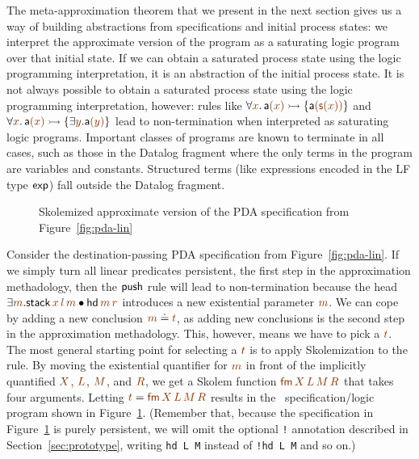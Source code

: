 The meta-approximation theorem that we present in the next section
gives us a way of building abstractions from specifications and
initial process states: we interpret the approximate version of the
program as a saturating logic program over that initial state. If we
can obtain a saturated process state using the logic programming
interpretation, it is an abstraction of the initial process state. It
is not always possible to obtain a saturated process state using the
logic programming interpretation, however: rules like $\forall
\lf{x}.\,{\sf a}\lf{(x)} \lefti \{ {\sf a}\lf{({\sf s}(x))} \}$ and
$\forall \lf{x}.\,{\sf a}\lf{(x)} \lefti \{ \exists \lf{y}. {\sf
  a}\lf{(y)} \}$ lead to non-termination when interpreted as
saturating logic programs. Important classes of programs are known to
terminate in all cases, such as those in the Datalog fragment where
the only terms in the program are variables and constants. Structured
terms (like expressions encoded in the LF type ${\sf exp}$) fall
outside the Datalog fragment.

\begin{figure}
\caption{Skolemized approximate version of the PDA specification from
Figure~\ref{fig:pda-lin}}
\label{fig:pda-pers}
\end{figure}

Consider the destination-passing PDA specification from
Figure~\ref{fig:pda-lin}. If we simply turn all linear predicates
persistent, the first step in the approximation methadology, then the
${\sf push}$ rule will lead to non-termination because the head
$\exists \lf{m}. {\sf stack}\,\lf{x}\,\lf{l}\,\lf{m} \fuse {\sf
  hd}\,\lf{m}\,\lf{r}$ introduces a new existential parameter
$\lf{m}$.  We can cope by adding a new conclusion $\lf{m} \doteq
\lf{t}$, as adding new conclusions is the second step in the
approximation methadology. This, however, means we have to pick a
$\lf{t}$.  The most general starting point for selecting a $\lf{t}$ is
to apply Skolemization to the rule. By moving the existential
quantifier for $\lf{m}$ in front of the implicitly quantified
$\lf{X}$, $\lf{L}$, $\lf{M}$, and $\lf{R}$, we get a Skolem function
$\lf{{\sf fm}\,X\,L\,M\,R}$ that takes four arguments. Letting $\lf{t}
= \lf{{\sf fm}\,X\,L\,M\,R}$ results in the \sls~specification/logic
program shown in Figure~\ref{fig:pda-pers}. (Remember that, because
the specification in Figure~\ref{fig:pda-pers} is purely persistent,
we will omit the optional \verb|!| annotation described in
Section~\ref{sec:prototype}, writing \verb|hd L M| instead of
\verb|!hd L M| and so on.)

